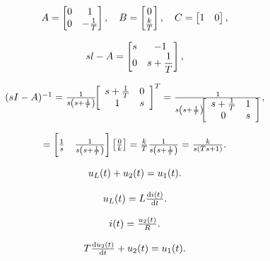 \documentclass{article}
\begin{document}
\[
$$
A=\left[ \begin{matrix} {0} & {1} \\ {0} & {-\frac{1} {T}} \\ \end{matrix} \right], \quad B=\left[ \begin{matrix} {0} \\ {\frac{k} {T}} \\ \end{matrix} \right], \quad C=\left[ \begin{matrix} {1} & {0} \\ \end{matrix} \right],
$$
\]

\[
$$
s l-A=\left[ \begin{matrix} {s} & {-1} \\ {0} & {s+\displaystyle{\frac{1} {T}}} \\ \end{matrix} \right],
$$
\]

\[
$$
( s I-A )^{-1}=\frac{1} {s \left( s+\frac{1} {T} \right)} \! \! \left[ \begin{array} {c c} {s+\frac{1} {T}} & {0} \\ {1} & {s} \\ \end{array} \right]^{T}=\frac{1} {s \left( s+\frac{1} {T} \right) \! \! \left[ \begin{array} {c c} {s+\frac{1} {T}} & {1} \\ {0} & {s} \\ \end{array} \right]},
$$
\]

\[
$$
= \left[ {\frac{1} {s}} \quad{\frac{1} {s \left( s+{\frac{1} {T}} \right)}} \right] \left[ {\frac{0} {k}} \right]={\frac{k} {T}} {\frac{1} {s \left( s+{\frac{1} {T}} \right)}}={\frac{k} {s \left( T s+1 \right)}}.
$$
\]

\[
$$
u_{L} ( t )+u_{2} ( t )=u_{1} ( t ).
$$
\]

\[
$$
u_{L} ( t )=L \frac{\mathrm{d} i ( t )} {\mathrm{d} t}.
$$
\]

\[
$$
i ( t )=\frac{u_{2} ( t )} {R}.
$$
\]

\[
$$
T \frac{\mathrm{d} u_{2} ( t )} {\mathrm{d} t}+u_{2} ( t )=u_{1} ( t ).
$$
\]
\end{document}

